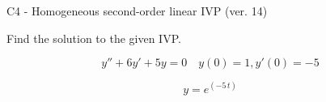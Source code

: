 \begin{exercise}
  \begin{exerciseTitle}C4 - Homogeneous second-order linear IVP (ver. 14)\end{exerciseTitle}
  \begin{exerciseStatement}
    
Find the solution to the given IVP.

    
\[y''+6y'+5y = 0 \hspace{1em} y(0) = 1 , y'(0) = -5\]

  \end{exerciseStatement}
  \begin{exerciseAnswer}
    
\[y= e^{\left(-5 \, t\right)}\]

  \end{exerciseAnswer}
\end{exercise}